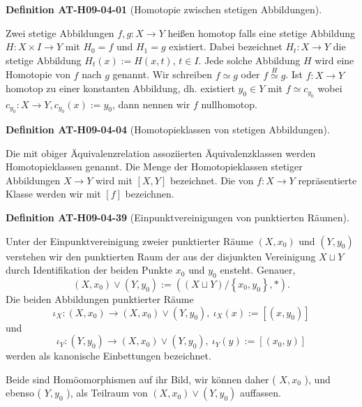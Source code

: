 \documentclass[10pt, letterpaper]{article}
\newcommand{\CustomHeading}[3]{%
  \par\medskip\noindent%
  \textbf{#1 #2} \textnormal{(#3)}.\enskip%
}
\newenvironment{DEF}[2]{\CustomHeading{Definition}{#1}{#2}}{}
\begin{document}
\begin{DEF}{AT-H09-04-01}{Homotopie zwischen stetigen Abbildungen}
Zwei stetige Abbildungen $f, g: X \rightarrow Y$ heißen homotop falls eine stetige Abbildung $H: X \times I \rightarrow Y$ mit $H_{0}=f$ und $H_{1}=g$ existiert. Dabei bezeichnet $H_{t}: X \rightarrow Y$ die stetige Abbildung $H_{t}(x):=H(x, t)$, $t \in I$. Jede solche Abbildung $H$ wird eine Homotopie von $f$ nach $g$ genannt. Wir schreiben $f \simeq g$ oder $f \stackrel{H}{\simeq} g$. Ist $f: X \rightarrow Y$ homotop zu einer konstanten Abbildung, dh. existiert $y_{0} \in Y$ mit $f \simeq c_{y_{0}}$ wobei $c_{y_{0}}: X \rightarrow Y, c_{y_{0}}(x):=y_{0}$, dann nennen wir $f$ nullhomotop.
\end{DEF}

\begin{DEF}{AT-H09-04-04}{Homotopieklassen von stetigen Abbildungen}
Die mit obiger Äquivalenzrelation assoziierten Äquivalenzklassen werden Homotopieklassen genannt. Die Menge der Homotopieklassen stetiger Abbildungen $X \rightarrow Y$ wird mit $[X, Y]$ bezeichnet. Die von $f: X \rightarrow Y$ repräsentierte Klasse werden wir mit $[f]$ bezeichnen.
\end{DEF}

\begin{DEF}{AT-H09-04-39}{Einpunktvereinigungen von punktierten Räumen}
Unter der Einpunktvereinigung zweier punktierter Räume $(X, x_{0})$ und $(Y, y_{0})$ verstehen wir den punktierten Raum der aus der disjunkten Vereinigung $X \sqcup Y$ durch Identifikation der beiden Punkte $x_{0}$ und $y_{0}$ ensteht. Genauer,
$$
\left(X, x_{0}\right) \vee\left(Y, y_{0}\right):=\left((X \sqcup Y) /\left\{x_{0}, y_{0}\right\}, *\right) .
$$
Die beiden Abbildungen punktierter Räume 
$$\iota_{X}:\left(X, x_{0}\right) \rightarrow\left(X, x_{0}\right) \vee\left(Y, y_{0}\right),\ \iota_{X}(x):=\left[\left(x, y_{0}\right)\right]$$ 
und 
$$\iota_{Y}:\left(Y, y_{0}\right) \rightarrow\left(X, x_{0}\right) \vee\left(Y, y_{0}\right),\ \iota_{Y}(y):=\left[\left(x_{0}, y\right)\right]$$ 
werden als kanonische Einbettungen bezeichnet. 

Beide sind Homöomorphismen auf ihr Bild, wir können daher ( $X, x_{0}$ ), und ebenso ( $Y, y_{0}$ ), als Teilraum von $\left(X, x_{0}\right) \vee\left(Y, y_{0}\right)$ auffassen.
\end{DEF}
\end{document}
